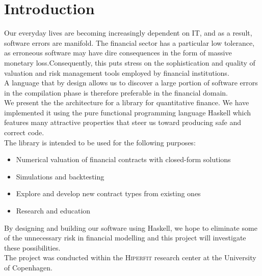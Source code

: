 \chapter{Introduction}

Our everyday lives are becoming increasingly dependent on IT, and as a result,
software errors are manifold. The financial sector has a particular low 
tolerance, as erroneous software may have dire consequences in the form of
massive monetary loss.Consequently, this puts stress on the sophistication and 
quality of valuation and risk management tools employed by financial institutions.\\
A language that by design allows us to discover a large portion of software
errors in the compilation phase is therefore preferable in the financial domain.\\

We present the the architecture for a library for quantitative finance. We have
implemented it using the pure functional programming language Haskell which
features many attractive properties that steer us toward producing safe and
correct code.\\

The library is intended to be used for the following purposes:\\

\begin{itemize}
\item Numerical valuation of financial contracts with closed-form solutions
\item Simulations and backtesting
\item Explore and develop new contract types from existing ones
\item Research and education
\end{itemize}

By designing and building our software using Haskell, we hope to eliminate 
some of the unnecessary risk in financial modelling and this project
will investigate these possibilities.\\

The project was conducted within the \textsc{Hiperfit} research center at the
University of Copenhagen.

